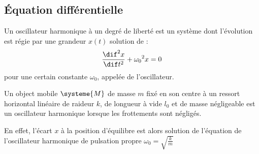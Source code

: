 \subsection{Équation différentielle}

\begin{definition}
Un oscillateur harmonique à un degré de liberté est un système dont l'évolution est régie par une grandeur $x(t)$ solution de :
\[\frac{\dif^2 x}{\dif t^2} + {\omega_0}^2 x = 0\]
pour une certain constante $\omega_0$, appelée  de l'oscillateur.
\end{definition}

\begin{exemple}
Un object mobile $\systeme{M}$ de masse $m$ fixé en son centre à un ressort horizontal linéaire de raideur $k$, de longueur à vide $l_0$ et de masse négligeable est un oscillateur harmonique lorsque les frottements sont négligés.

\begin{figure}[H]
\begin{center}
\end{center}
\end{figure}

\noindent En effet, l'écart $x$ à la position d'équilibre est alors solution de l'équation de l'oscillateur harmonique de pulsation propre $\omega_0 = \sqrt{\frac{k}{m}}$
\end{exemple}



